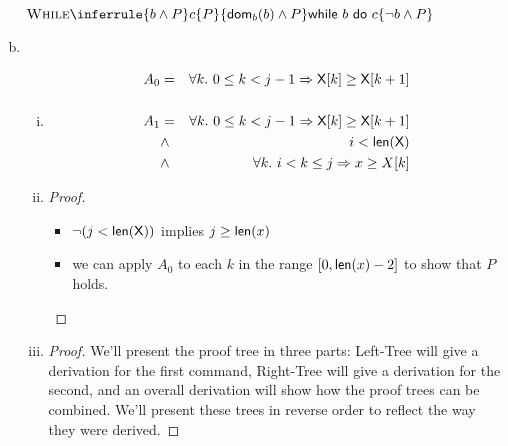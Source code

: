 \begin{enumerate}[(a)]
$\Rule{While}{
    \{ b \wedge P \}
    c
    \{ P \}
}{
    \{ \dom_b(b) \wedge P \}
    \whilestmt{b}{c}
    \{ \neg b \wedge P \}
}$

\item
\begin{enumerate}[i.]
    \item
    \begin{eqnarray*}
        A_0 & = & \forall k .~0 \leq k < j - 1 \Rightarrow  {\sf X}[k] \geq {\sf X}[k + 1] \\
              & & \\
        A_1 & = & \forall k.~0 \leq k < j - 1 \Rightarrow \textsf{X}[k] \geq \textsf{X}[k + 1] \\
              & \wedge     & i < \textsf{len}(\textsf{X}) \\
              & \wedge     & \forall k .~i < k \leq j \Rightarrow  x \geq X[k]
    \end{eqnarray*}

    \item
    \begin{proof} \hspace{1cm} \\
        \begin{itemize}
        \item $\neg (j < {\sf len(X)})$ implies $j \geq {\sf len}(x)$
        \item we can apply $A_0$ to each $k$ in the range
        $[0, {\sf len}(x) - 2]$ to show that $P$ holds.
        \end{itemize}
    \end{proof}

    \item
    \begin{proof} We'll present the proof tree in three parts: Left-Tree will
        give a derivation for the first command, Right-Tree will give a
        derivation for the second, and an overall derivation will
        show how the proof trees can be combined. We'll present these trees
        in reverse order to reflect the way they were derived.

        \newcommand{\leftPremise}{
            \{ \dom_a(i + 1) \wedge \dom_a({\sf X}[i])
               \wedge A_1[i - 1 / i][i + 1 \mapsto \X[\X[i]
             \}
             ~\X[i = 1] = \X[i]~
             \{ A_1[i - 1/ i] \}
        }

        \newcommand{\leftBase}{
            \{ A_1 \wedge ((i \geq 0) \wedge {\sf X}[i] < x) \}
            ~\X[i = 1] = \X[i]~
            \{ A_1[i - 1/ i] \}
        }


\end{proof}
\end{enumerate}
\end{enumerate}
